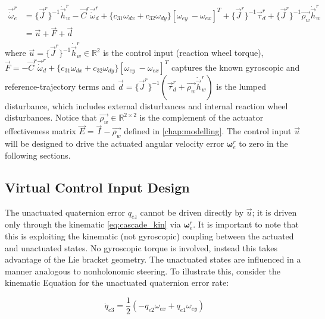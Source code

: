 \begin{equation}
\begin{split}
        \vec{\dot{\omega}}^r_e &= \{\vec{J}^r\}^{-1}\dot{\vec{h}}^r_w - \vec{C}^r \vec{\dot{\omega}}_d^r + \{ c_{31} \omega_{dx} + c_{32} \omega_{dy}\}[\omega_{ey} \ -\omega_{ex}]^T + \{\vec{J}^r\}^{-1} \vec{\tau}_d^r + \{\vec{J}^r\}^{-1} \vec{\rho_w} \dot{\vec{h}}_w^r \\
    &= \vec{u} + \vec{F} + \vec{d} \label{eq:cascade_dyn} \\
\end{split}
\end{equation}
where $\vec{u} = \{\vec{J}^r\}^{-1}\dot{\vec{h}}^r_w \in \mathbb{R}^2$ is the control input (reaction wheel torque), $\vec{F} = - \vec{C}^r \vec{\dot{\omega}}_d^r + \{ c_{31} \omega_{dx} + c_{32} \omega_{dy} \} [\omega_{ey} \ -\omega_{ex}]^T$ captures the known gyroscopic and reference-trajectory terms and $\vec{d} = \{\vec{J}^r\}^{-1} (\vec{\tau}_d^r + \vec{\rho_w} \dot{\vec{h}}_w^r)$ is the lumped disturbance, which includes external disturbances and internal reaction wheel disturbances. Notice that $\vec{\rho_w} \in \mathbb{R}^{2\times2}$ is the complement of the actuator effectiveness matrix $\vec{E} = \vec{I} - \vec{\rho_w}$ defined in \autoref{chap:modelling}. The control input $\vec{u}$ will be designed to drive the actuated angular velocity error $\boldsymbol{\omega}^r_e$ to zero in the following sections.

\subsection{Virtual Control Input Design}
\label{subsec:hypersurface_design}

The unactuated quaternion error $q_{ez}$ cannot be driven directly by $\vec{u}$; it is driven only through the kinematic \autoref{eq:cascade_kin} via $\boldsymbol{\omega}^r_e$. It is important to note that this is exploiting the kinematic (not gyroscopic) coupling between the actuated and unactuated states. No gyroscopic torque is involved, instead this takes advantage of the Lie bracket geometry. The unactuated states are influenced in a manner analogous to nonholonomic steering. To illustrate this, consider the kinematic Equation for the unactuated quaternion error rate:

\begin{equation}
    \dot{q}_{e3} = \frac{1}{2}(-q_{e2}\omega_{ex} + q_{e1}\omega_{ey})
\end{equation}

